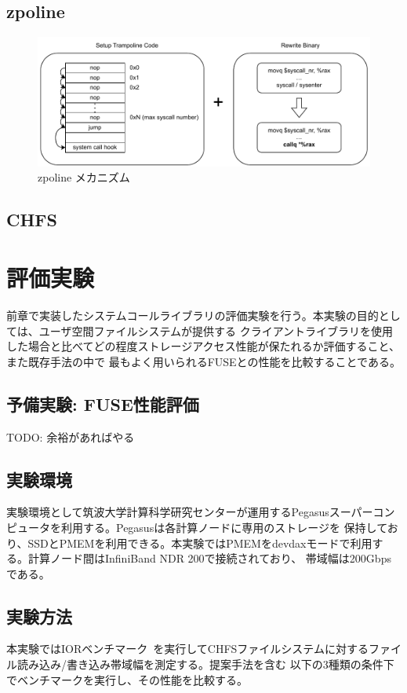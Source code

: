 \documentclass[a4paper,11pt]{jreport}
\begin{document}
\section{zpoline}

\begin{figure}[h]
	\begin{minipage}[b]{1\columnwidth}
		\centering
		\includegraphics[width=0.9\linewidth]{./figure/zpoline_mechanism.pdf}
		\caption{zpoline メカニズム}
		\label{fig:Zpoline mechanism}
	\end{minipage}
\end{figure}

\section{CHFS}

\chapter{評価実験}
前章で実装したシステムコールライブラリの評価実験を行う。本実験の目的としては、ユーザ空間ファイルシステムが提供する
クライアントライブラリを使用した場合と比べてどの程度ストレージアクセス性能が保たれるか評価すること、また既存手法の中で
最もよく用いられるFUSEとの性能を比較することである。

\section{予備実験: FUSE性能評価}
TODO: 余裕があればやる
\section{実験環境}
実験環境として筑波大学計算科学研究センターが運用するPegasusスーパーコンピュータを利用する。Pegasusは各計算ノードに専用のストレージを
保持しており、SSDとPMEMを利用できる。本実験ではPMEMをdevdaxモードで利用する。計算ノード間はInfiniBand NDR 200で接続されており、
帯域幅は200Gbpsである。
\section{実験方法}
本実験ではIORベンチマーク~\cite{ior}を実行してCHFSファイルシステムに対するファイル読み込み/書き込み帯域幅を測定する。提案手法を含む
以下の3種類の条件下でベンチマークを実行し、その性能を比較する。
\end{document}
